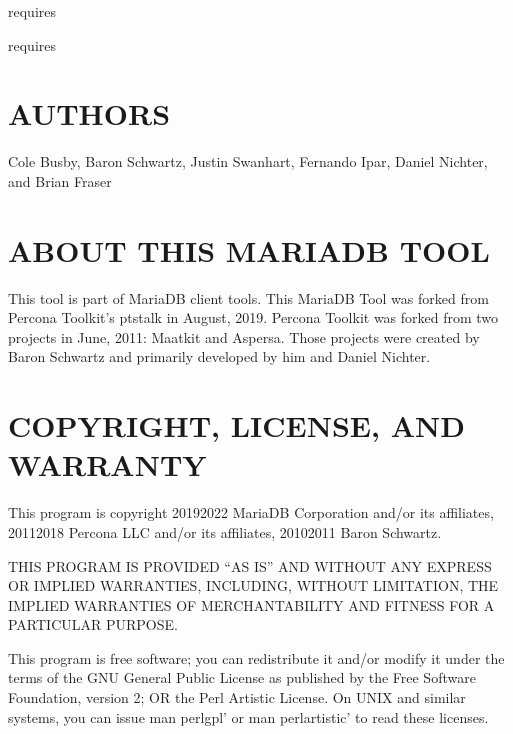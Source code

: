 \documentclass[letterpaper,10pt,english]{sphinxmanual}
\begin{document}
{\hyperref[\detokenize{mariadb-stat:cmdoption-mariadb-stat-collect-strace}]{}} requires 

{\hyperref[\detokenize{mariadb-stat:cmdoption-mariadb-stat-collect-tcpdump}]{}} requires 


\section{AUTHORS}
\label{\detokenize{mariadb-stat:authors}}
Cole Busby, Baron Schwartz, Justin Swanhart, Fernando Ipar, Daniel Nichter,
and Brian Fraser


\section{ABOUT THIS MARIADB TOOL}
\label{\detokenize{mariadb-stat:about-this-mariadb-tool}}
This tool is part of MariaDB client tools. This MariaDB Tool was forked from
Percona Toolkit’s pt\sphinxhyphen{}stalk in August, 2019. Percona Toolkit was forked from two
projects in June, 2011: Maatkit and Aspersa.  Those projects were created by
Baron Schwartz and primarily developed by him and Daniel Nichter.


\section{COPYRIGHT, LICENSE, AND WARRANTY}
\label{\detokenize{mariadb-stat:copyright-license-and-warranty}}
This program is copyright 2019\sphinxhyphen{}2022 MariaDB Corporation and/or its affiliates,
2011\sphinxhyphen{}2018 Percona LLC and/or its affiliates, 2010\sphinxhyphen{}2011 Baron Schwartz.

THIS PROGRAM IS PROVIDED “AS IS” AND WITHOUT ANY EXPRESS OR IMPLIED
WARRANTIES, INCLUDING, WITHOUT LIMITATION, THE IMPLIED WARRANTIES OF
MERCHANTABILITY AND FITNESS FOR A PARTICULAR PURPOSE.

This program is free software; you can redistribute it and/or modify it under
the terms of the GNU General Public License as published by the Free Software
Foundation, version 2; OR the Perl Artistic License.  On UNIX and similar
systems, you can issue \textasciigrave{}man perlgpl’ or \textasciigrave{}man perlartistic’ to read these
licenses.
\end{document}

